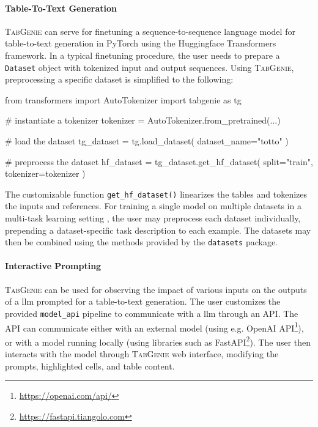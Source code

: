 \paragraph{Table-To-Text Generation} \textsc{TabGenie} can serve for finetuning a sequence-to-sequence language model for table-to-text generation in PyTorch \cite{paszke2019pytorch} using the Huggingface Transformers \cite{wolf2019HuggingFacesTS} framework. In a typical finetuning procedure, the user needs to prepare a \texttt{Dataset} object with tokenized input and output sequences. Using \textsc{TabGenie}, preprocessing a specific dataset is simplified to the following:
\begin{python}
from transformers import AutoTokenizer
import tabgenie as tg

# instantiate a tokenizer
tokenizer = AutoTokenizer.from_pretrained(...)

# load the dataset
tg_dataset = tg.load_dataset(
    dataset_name="totto"
)

# preprocess the dataset
hf_dataset = tg_dataset.get_hf_dataset(
    split="train",
    tokenizer=tokenizer
)
\end{python}
The customizable function \texttt{get\_hf\_dataset()} linearizes the tables and tokenizes the inputs and references. For training a single model on multiple datasets in a multi-task learning setting \cite{xieUnifiedSKGUnifyingMultiTasking2022}, the user may preprocess each dataset individually, prepending a dataset-specific task description to each example. The datasets may then be combined using the methods provided by the \texttt{datasets} package.

\paragraph{Interactive Prompting} \textsc{TabGenie} can be used for observing the impact of various inputs on the outputs of a \ac{llm} prompted for a table-to-text generation. The user customizes the provided \texttt{model\_api} pipeline to communicate with a \ac{llm} through an API. The API can communicate either with an external model (using e.g. OpenAI API\footnote{\url{https://openai.com/api/}}), or with a model running locally (using libraries such as FastAPI\footnote{\url{https://fastapi.tiangolo.com}}). The user then interacts with the model through \textsc{TabGenie} web interface, modifying the prompts, highlighted cells, and table content.

